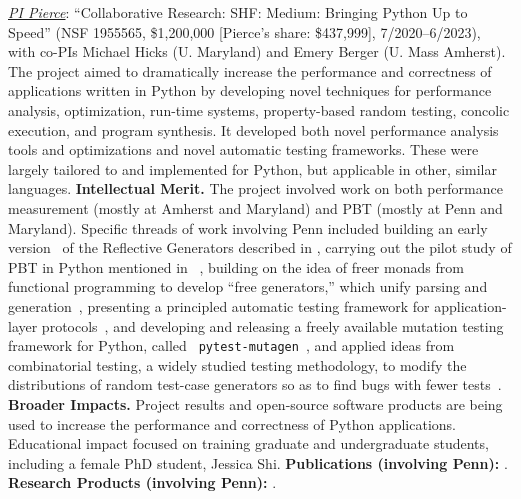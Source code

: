{


\emph{\underline{PI Pierce}}: ``Collaborative Research:
SHF: Medium: Bringing Python Up to Speed'' (NSF 1955565, \$1,200,000
[Pierce's share: \$437,999],
7/2020--6/2023), with co-PIs Michael Hicks (U. Maryland) and Emery Berger
(U. Mass Amherst).
The project aimed to dramatically increase the performance and
correctness of applications written in Python by developing novel
techniques for performance analysis, optimization, run-time systems,
property-based random testing, concolic execution, and program
synthesis. It developed both
novel performance analysis tools and optimizations and novel automatic
testing frameworks. These were largely tailored to and implemented for
Python, but applicable in other, similar languages.
%
{\bf Intellectual Merit.} The project involved work on both
performance measurement (mostly at Amherst and Maryland) and PBT (mostly at Penn
and Maryland).  Specific threads of work involving Penn included
building an early
version~\cite{Frohlich2023} of the Reflective Generators described in
, carrying out the pilot study of PBT in Python
mentioned in
~\cite{goldstein_problems_2022},
building on the idea of
freer monads from functional programming to develop ``free
generators,'' which unify parsing and
generation~\cite{goldstein2022parsing},
presenting a principled
automatic testing framework for application-layer
protocols~\cite{Li2021:MBToNA}, and developing and releasing a freely
available mutation testing framework for Python, called {\tt
  pytest-mutagen}~\cite{pytestmutagen}, and applied ideas from
combinatorial testing, a widely studied testing methodology, to modify
the distributions of random test-case generators so as to find bugs
with fewer tests~\cite{DBLP:conf/esop/GoldsteinHLP21}.
%
{\bf Broader Impacts.} Project results and open-source software
products are being used to increase the
performance and correctness of Python applications.
Educational impact focused on training graduate and
undergraduate students, including a female PhD student, Jessica
Shi.
%
{\bf Publications (involving Penn):} \cite{Frohlich2023,DBLP:conf/esop/GoldsteinHLP21,
  goldstein2022parsing, goldstein_problems_2022, Li2021:MBToNA}.
{\bf Research Products (involving Penn):} \cite{pytestmutagen}.

}
